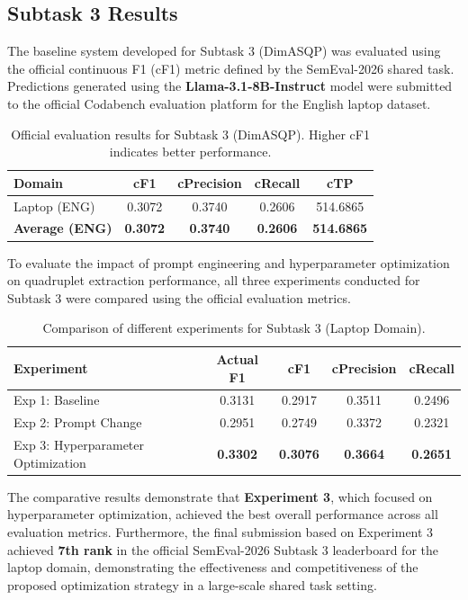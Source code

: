 \documentclass{article}
\begin{document}
\subsection{Subtask 3 Results}

The baseline system developed for Subtask 3 (DimASQP) was evaluated using the official continuous F1 (cF1) metric defined by the SemEval-2026 shared task. Predictions generated using the \textbf{Llama-3.1-8B-Instruct} model were submitted to the official Codabench evaluation platform for the English laptop dataset.

\begin{table}[htbp]
\centering
\caption{Official evaluation results for Subtask 3 (DimASQP). Higher cF1 indicates better performance.}
\label{tab:subtask3_results}
\begin{tabular}{lcccc}
\hline
\textbf{Domain} & \textbf{cF1} & \textbf{cPrecision} & \textbf{cRecall} & \textbf{cTP} \\
\hline
Laptop (ENG) & 0.3072 & 0.3740 & 0.2606 & 514.6865 \\
\hline
\textbf{Average (ENG)} & \textbf{0.3072} & \textbf{0.3740} & \textbf{0.2606} & \textbf{514.6865} \\
\hline
\end{tabular}
\end{table}


To evaluate the impact of prompt engineering and hyperparameter optimization on quadruplet extraction performance, all three experiments conducted for Subtask 3 were compared using the official evaluation metrics.

\begin{table}[htbp]
\centering
\caption{Comparison of different experiments for Subtask 3 (Laptop Domain).}
\label{tab:subtask3_experiments}
\begin{tabular}{lcccc}
\hline
\textbf{Experiment} & \textbf{Actual F1} & \textbf{cF1} & \textbf{cPrecision} & \textbf{cRecall} \\
\hline
Exp 1: Baseline & 0.3131 & 0.2917 & 0.3511 & 0.2496 \\
Exp 2: Prompt Change & 0.2951 & 0.2749 & 0.3372 & 0.2321 \\
Exp 3: Hyperparameter Optimization & \textbf{0.3302} & \textbf{0.3076} & \textbf{0.3664} & \textbf{0.2651} \\
\hline
\end{tabular}
\end{table}

The comparative results demonstrate that \textbf{Experiment 3}, which focused on hyperparameter optimization, achieved the best overall performance across all evaluation metrics. Furthermore, the final submission based on Experiment 3 achieved \textbf{7th rank} in the official SemEval-2026 Subtask 3 leaderboard for the laptop domain, demonstrating the effectiveness and competitiveness of the proposed optimization strategy in a large-scale shared task setting.
\end{document}
